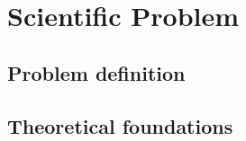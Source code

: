 \chapter{Scientific Problem}
\label{section:scientificProblem}


\section{Problem definition}
\label{section:problemDefinition}

\section{Theoretical foundations}
\label{section:stateOfTheArt}
